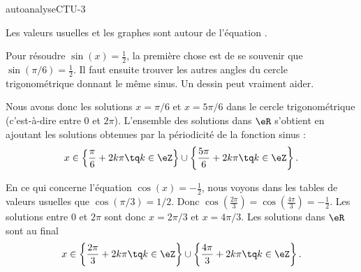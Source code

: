 
\begin{corrige}{autoanalyseCTU-3}

    \begin{center}
   
    \end{center}

Les valeurs usuelles et les graphes sont autour de l'équation \pageref{PGooIMQFooTnBdIl}.

Pour résoudre \( \sin(x)=\frac{ 1 }{2}\), la première chose est de se souvenir que \( \sin(\pi/6)=\frac{ 1 }{2}\). Il faut ensuite trouver les autres angles du cercle trigonométrique donnant le même sinus. Un dessin peut vraiment aider.

Nous avons donc les solutions \( x=\pi/6\) et \( x=5\pi/6\) dans le cercle trigonométrique (c'est-à-dire entre \( 0\) et \( 2\pi\)). L'ensemble des solutions dans \( \eR\) s'obtient en ajoutant les solutions obtenues par la périodicité de la fonction sinus :
\begin{equation}
    x\in\left\{ \frac{ \pi }{ 6 }+2k\pi\tq k\in \eZ \right\}\cup\left\{ \frac{ 5\pi }{ 6 }+2k\pi\tq k\in \eZ \right\}.
\end{equation}

En ce qui concerne l'équation \( \cos(x)=-\frac{ 1 }{2}\), nous voyons dans les tables de valeurs usuelles que \( \cos(\pi/3)=1/2\). Donc \( \cos(\frac{ 2\pi }{ 3 })=\cos(\frac{ 4\pi }{ 3 })=-\frac{ 1 }{2}\). Les solutions entre \( 0\) et \( 2\pi\) sont donc \( x=2\pi/3\) et \( x=4\pi/3\). Les solutions dans \( \eR\) sont au final
\begin{equation}
    x\in\left\{ \frac{ 2\pi }{ 3 }+2k\pi\tq k\in \eZ \right\}\cup\left\{ \frac{ 4\pi }{ 3 }+2k\pi\tq k\in \eZ \right\}.
\end{equation}

\end{corrige}   

